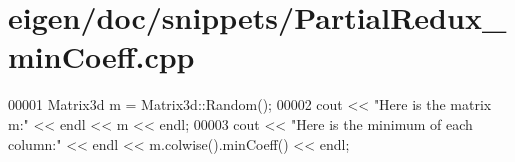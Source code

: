 \hypertarget{eigen_2doc_2snippets_2_partial_redux__min_coeff_8cpp_source}{}\section{eigen/doc/snippets/\+Partial\+Redux\+\_\+min\+Coeff.cpp}
\label{eigen_2doc_2snippets_2_partial_redux__min_coeff_8cpp_source}

\begin{DoxyCode}
00001 Matrix3d m = Matrix3d::Random();
00002 cout << \textcolor{stringliteral}{"Here is the matrix m:"} << endl << m << endl;
00003 cout << \textcolor{stringliteral}{"Here is the minimum of each column:"} << endl << m.colwise().minCoeff() << endl;
\end{DoxyCode}
